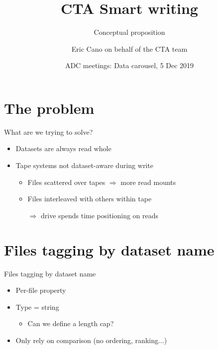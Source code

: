\documentclass[aspectratio=149]{beamer}
\author{Eric Cano on behalf of the CTA team}
\title{CTA Smart writing}
\subtitle{Conceptual proposition}
\date{ADC meetings: Data carousel, 5 Dec 2019}
\begin{document}
\frontcover

\frame{\titlepage}

\frame{\tableofcontents}

\section{The problem}
\begin{frame}{What are we trying to solve?}
  \begin{itemize}
    \item Datasets are always read whole
    \item Tape systems not dataset-aware during write
    \begin{itemize}    
      \item Files scattered over tapes $\Rightarrow$ more read mounts
      \item Files interleaved with others within tape
      
      $\Rightarrow$ drive spends time positioning on reads
    \end{itemize}
  \end{itemize}
\end{frame}

\section{Files tagging by dataset name}
\begin{frame}{Files tagging by dataset name}
\begin{itemize}
  \item Per-file property
  \item Type = string
  \begin{itemize}
    \item Can we define a length cap? 
  \end{itemize}
  \item Only rely on comparison (no ordering, ranking...)
\end{itemize}
\end{frame}
\end{document}
